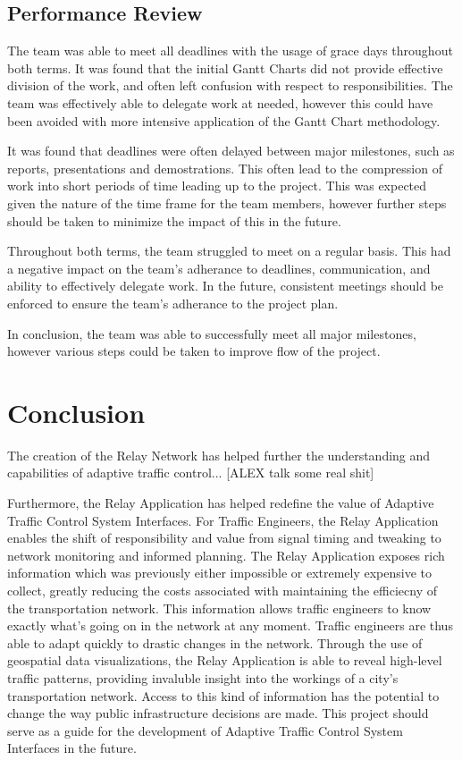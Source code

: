 \documentclass{report}
\begin{document}
\subsection{Performance Review}
The team was able to meet all deadlines with the usage of grace days throughout both terms. It was found that the initial Gantt Charts did not provide effective division of the work, and often left confusion with respect to responsibilities. The team was effectively able to delegate work at needed, however this could have been avoided with more intensive application of the Gantt Chart methodology.

It was found that deadlines were often delayed between major milestones, such as reports, presentations and demostrations. This often lead to the compression of work into short periods of time leading up to the project. This was expected given the nature of the time frame for the team members, however further steps should be taken to minimize the impact of this in the future.

Throughout both terms, the team struggled to meet on a regular basis. This had a negative impact on the team's adherance to deadlines, communication, and ability to effectively delegate work. In the future, consistent meetings should be enforced to ensure the team's adherance to the project plan.

In conclusion, the team was able to successfully meet all major milestones, however various steps could be taken to improve flow of the project. 

\newpage
\section{Conclusion}
The creation of the Relay Network  has helped further the understanding and capabilities of adaptive traffic control... [ALEX talk some real shit]

Furthermore, the Relay Application has helped redefine the value of Adaptive Traffic Control System Interfaces. For Traffic Engineers, the Relay Application enables the shift of responsibility and value from signal timing and tweaking to network monitoring and informed planning. The Relay Application exposes rich information which was previously either impossible or extremely expensive to collect, greatly reducing the costs associated with maintaining the efficiecny of the transportation network. This information allows traffic engineers to know exactly what's going on in the network at any moment. Traffic engineers are thus able to adapt quickly to drastic changes in the network. Through the use of geospatial data visualizations, the Relay Application is able to reveal high-level traffic patterns, providing invaluble insight into the workings of a city's transportation network. Access to this kind of information has the potential to change the way public infrastructure decisions are made. This project should serve as a guide for the development of Adaptive Traffic Control System Interfaces in the future.
\end{document}
